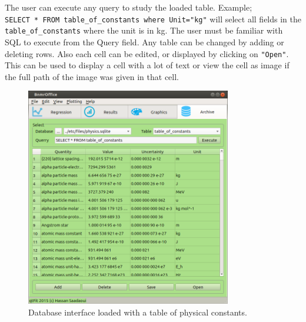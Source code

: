 \documentclass[10pt,letterpaper,oneside]{article}
\begin{document}
The user can execute any query to study the loaded table. Example;\\ \verb+SELECT * FROM table_of_constants where Unit="kg"+ will select all fields in the \verb+table_of_constants+ where the unit is in kg. The user must be familiar with SQL to execute from the Query field. Any table can be changed by adding or deleting rows. Also each cell can be edited, or displayed by clicking on \verb+"Open"+. This can be used to display a cell with a lot of text or view the cell as image if the full path of the image was given in that cell. 
\begin{figure}[!htb]
\center
\includegraphics[width=0.8\textwidth]{archive.png}
 \caption{Database interface loaded with a table of physical constants.}
 \label{fig-mag}
 \end{figure}




\newpage
\end{document}
